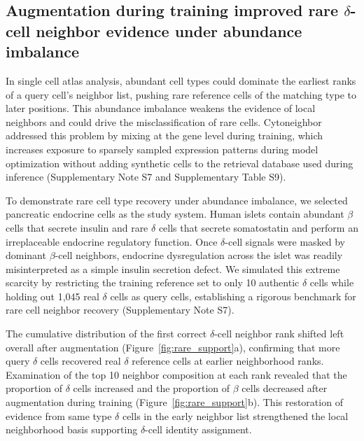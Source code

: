 \documentclass[11pt]{article}
\begin{document}
\FloatBarrier

\subsection*{Augmentation during training improved rare $\delta$-cell neighbor evidence under abundance imbalance}

In single cell atlas analysis, abundant cell types could dominate the earliest ranks of a query cell's neighbor list, pushing rare reference cells of the matching type to later positions. This abundance imbalance weakens the evidence of local neighbors and could drive the misclassification of rare cells. Cytoneighbor addressed this problem by mixing at the gene level during training, which increases exposure to sparsely sampled expression patterns during model optimization without adding synthetic cells to the retrieval database used during inference (Supplementary Note S7 and Supplementary Table S9).

To demonstrate rare cell type recovery under abundance imbalance, we selected pancreatic endocrine cells\cite{Muraro2016Pancreas,Baron2016Pancreas,Segerstolpe2016Pancreas,Xin2016Pancreas,Lawlor2017Pancreas} as the study system. Human islets contain abundant $\beta$ cells that secrete insulin and rare $\delta$ cells that secrete somatostatin and perform an irreplaceable endocrine regulatory function. Once $\delta$-cell signals were masked by dominant $\beta$-cell neighbors, endocrine dysregulation across the islet was readily misinterpreted as a simple insulin secretion defect. We simulated this extreme scarcity by restricting the training reference set to only 10 authentic $\delta$ cells while holding out 1,045 real $\delta$ cells as query cells, establishing a rigorous benchmark for rare cell neighbor recovery (Supplementary Note S7).

The cumulative distribution of the first correct $\delta$-cell neighbor rank shifted left overall after augmentation (Figure~\ref{fig:rare_support}a), confirming that more query $\delta$ cells recovered real $\delta$ reference cells at earlier neighborhood ranks. Examination of the top 10 neighbor composition at each rank revealed that the proportion of $\delta$ cells increased and the proportion of $\beta$ cells decreased after augmentation during training (Figure~\ref{fig:rare_support}b). This restoration of evidence from same type $\delta$ cells in the early neighbor list strengthened the local neighborhood basis supporting $\delta$-cell identity assignment.
\end{document}

